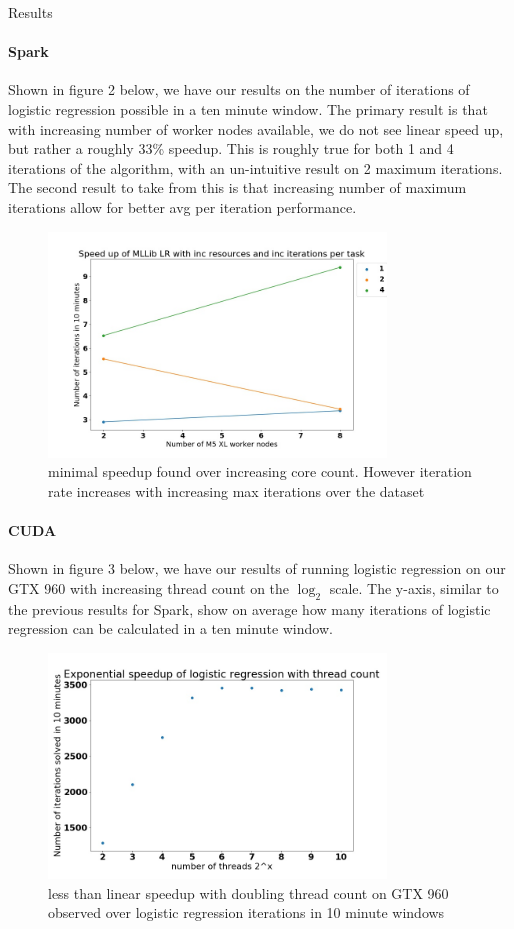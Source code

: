 \documentclass[11pt]{article}
\begin{document}
\begin{section}{Results}
\paragraph{Spark}
Shown in figure 2 below, we have our results on the number of iterations of logistic regression possible in a ten minute window. The primary result is that with increasing number of worker nodes available, we do not see linear speed up, but rather a roughly 33\% speedup. This is roughly true for both 1 and 4 iterations of the algorithm, with an un-intuitive result on 2 maximum iterations. The second result to take from this is that increasing number of maximum iterations allow for better avg per iteration performance.
\begin{figure}[H]
	\centering
	\includegraphics[width=0.8\textwidth]{../images/sparkResults.jpg}
	\caption{minimal speedup found over increasing core count. However iteration rate increases with increasing max iterations over the dataset}
\end{figure}

\paragraph{CUDA}
Shown in figure 3 below, we have our results of running logistic regression on our GTX 960 with increasing thread count on the $\log_2$ scale. The y-axis, similar to the previous results for Spark, show on average how many iterations of logistic regression can be calculated in a ten minute window.
\begin{figure}[H]
	\centering
	\includegraphics[width=0.8\textwidth]{../images/CUDAResults.jpg}
	\caption{less than linear speedup with doubling thread count on GTX 960 observed over logistic regression iterations in 10 minute windows}
\end{figure}


\end{section}
\end{document}
